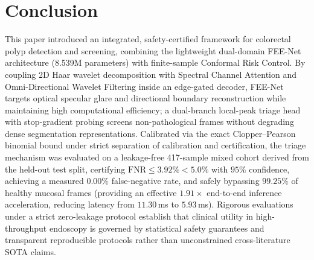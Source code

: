 \documentclass[journal]{IEEEtran}
\begin{document}
\section{Conclusion}
This paper introduced an integrated, safety-certified framework for colorectal polyp detection and screening, combining the lightweight dual-domain FEE-Net architecture (8.539M parameters) with finite-sample Conformal Risk Control. By coupling 2D Haar wavelet decomposition with Spectral Channel Attention and Omni-Directional Wavelet Filtering inside an edge-gated decoder, FEE-Net targets optical specular glare and directional boundary reconstruction while maintaining high computational efficiency; a dual-branch local-peak triage head with stop-gradient probing screens non-pathological frames without degrading dense segmentation representations. Calibrated via the exact Clopper--Pearson binomial bound under strict separation of calibration and certification, the triage mechanism was evaluated on a leakage-free 417-sample mixed cohort derived from the held-out test split, certifying $\mathrm{FNR} \le 3.92\% < 5.0\%$ with $95\%$ confidence, achieving a measured $0.00\%$ false-negative rate, and safely bypassing $99.25\%$ of healthy mucosal frames (providing an effective $1.91\times$ end-to-end inference acceleration, reducing latency from $11.30$\,ms to $5.93$\,ms). Rigorous evaluations under a strict zero-leakage protocol establish that clinical utility in high-throughput endoscopy is governed by statistical safety guarantees and transparent reproducible protocols rather than unconstrained cross-literature SOTA claims.
\end{document}
